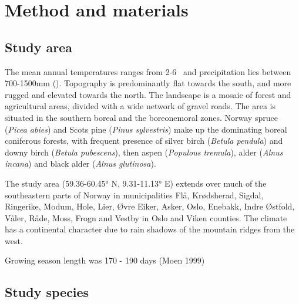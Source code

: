 \chapter{Method and materials}


\section{Study area} %


The mean annual temperatures ranges from 2-6 \celsius \ and precipitation lies between 700-1500mm (\cite{Moen1999}). 
Topography is predominantly flat towards the south, and more rugged and elevated towards the north. The landscape is a mosaic of forest and agricultural areas, divided with a wide network of gravel roads.
The area is situated in the southern boreal and the boreonemoral zones. %
Norway spruce (\textit{Picea abies}) and Scots pine (\textit{Pinus sylvestris}) make up the dominating boreal coniferous forests, with frequent presence of silver birch (\textit{Betula pendula}) and downy birch (\textit{Betula pubescens}), then aspen (\textit{Populous tremula}), alder (\textit{Alnus incana}) and black alder (\textit{Alnus glutinosa}).


The study area (59.36-60.45° N, 9.31-11.13° E) extends over much of the southeastern parts of Norway in municipalities Flå, Krødsherad, Sigdal, Ringerike, Modum, Hole, Lier, Øvre Eiker, Asker, Oslo, Enebakk, Indre Østfold, Våler, Råde, Moss, Frogn and Vestby in Oslo and Viken counties. 
The climate has a continental character due to rain shadows of the mountain ridges from the west. 


Growing season length was 170 - 190 days (Moen 1999) %


\section{Study species} %

